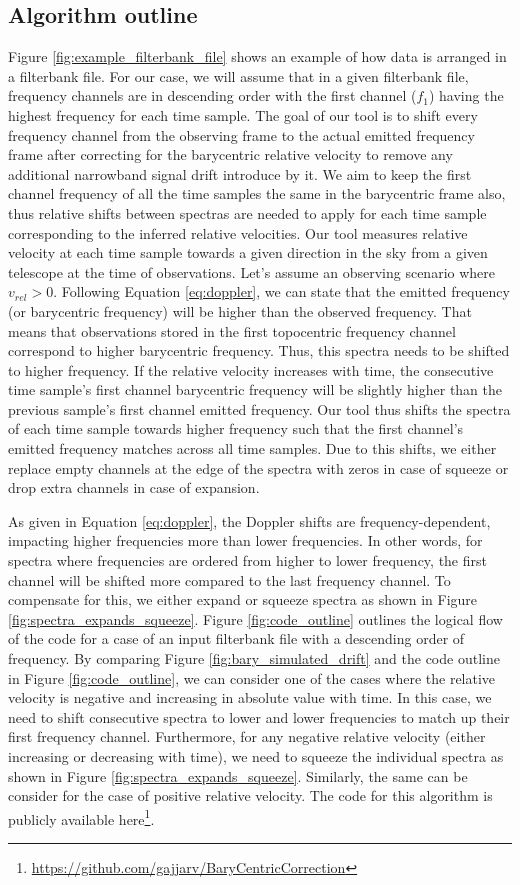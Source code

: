 \subsection{Algorithm outline}
Figure \ref{fig:example_filterbank_file} shows an example of how data is arranged in a filterbank file. For our case, we will assume that in a given filterbank file, frequency channels are in descending order with the first channel ($f_{1}$) having the highest frequency for each time sample. 
The goal of our tool is to shift every frequency channel from the observing frame to the actual emitted frequency frame after correcting for the barycentric relative velocity to remove any additional narrowband signal drift introduce by it. We aim to keep the first channel frequency of all the time samples the same in the barycentric frame also, thus relative shifts between spectras are needed to apply for each time sample corresponding to the inferred relative velocities. Our tool measures relative velocity at each time sample towards a given direction in the sky from a given telescope at the time of observations. Let's assume an observing scenario where $v_{rel}>0$. Following Equation \ref{eq:doppler}, we can state that the emitted frequency (or barycentric frequency) will be higher than the observed frequency. That means that observations stored in the first topocentric frequency channel correspond to higher barycentric frequency. Thus, this spectra needs to be shifted to higher frequency. If the relative velocity increases with time, the consecutive time sample's first channel barycentric frequency will be slightly higher than  the previous sample's first channel emitted frequency. Our tool thus shifts the spectra of each time sample towards higher frequency such that the first channel's emitted frequency matches across all time samples. 
Due to this shifts, we either replace empty channels at the edge of the spectra with zeros in case of squeeze or drop extra channels in case of expansion. 

As given in Equation \ref{eq:doppler}, the Doppler shifts are frequency-dependent, impacting higher frequencies more than lower frequencies. In other words, for spectra where frequencies are ordered from higher to lower frequency, the first channel will be shifted more compared to the last frequency channel. To compensate for this, we either expand or squeeze spectra as shown in Figure \ref{fig:spectra_expands_squeeze}. Figure \ref{fig:code_outline} outlines the logical flow of the code for a case of an input filterbank file with a descending order of frequency. By comparing Figure \ref{fig:bary_simulated_drift} and the code outline in Figure \ref{fig:code_outline}, we can consider one of the cases where the relative velocity is negative and increasing in absolute value with time. In this case, we need to shift consecutive spectra to lower and lower frequencies to match up their first frequency channel. Furthermore, for any negative relative velocity (either increasing or decreasing with time), we need to squeeze the individual spectra as shown in Figure \ref{fig:spectra_expands_squeeze}. Similarly, the same can be consider for the case of positive relative velocity. The code for this algorithm is publicly  available here\footnote{\url{https://github.com/gajjarv/BaryCentricCorrection}}.

